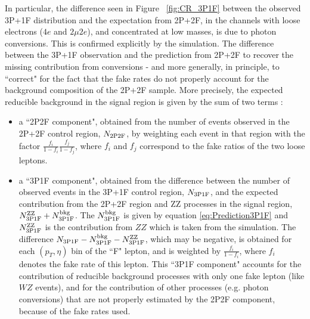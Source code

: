 In particular, the  difference seen in Figure ~\ref{fig:CR_3P1F} between the observed
3P+1F distribution and the expectation from 2P+2F, in the
channels with loose electrons ($4e$ and $2\mu 2e$), and concentrated at low
masses, is due to photon conversions. This is confirmed explicitly by the
simulation.
%
The difference between the 3P+1F observation and the prediction
from 2P+2F to recover the missing contribution from conversions - and more generally,
in principle, to ``correct" for the fact that the fake rates do not properly
account for the background composition of the 2P+2F sample.
More precisely, the expected reducible background in the signal region is given
by the sum of two terms :
%
\begin{itemize}
\item a ``2P2F component", obtained from the number of
  events observed in the 2P+2F control region, $N_{\rm 2P2F}$, by
  weighting each event in that region with the factor
  $\frac{f_{i}}{1-f_{i}} \frac{f_{j}}{1-f_{j}}$, where $f_{i}$ and
  $f_{j}$ correspond to the fake ratios of the two loose leptons.
\item a ``3P1F component", obtained from the
   difference between the number of observed events in the 3P+1F control
   region, $N_{\rm 3P1F}$, and the expected contribution from the 2P+2F
   region and ZZ processes in the signal region, $N^{\rm ZZ}_{\rm 3P1F} +
   N^{\rm bkg}_{\rm 3P1F}$. The $N^{\rm bkg}_{\rm 3P1F}$ is given by 
   equation \ref{eq:Prediction3P1F} and $N^{\rm ZZ}_{\rm 3P1F}$ is the
   contribution from $ZZ$ which is taken from the simulation. 
   The difference $N_{\rm 3P1F} -  N^{\rm bkg}_{\rm 3P1F} - N^{\rm ZZ}_{\rm 3P1F}$,
   which may be negative,
   is obtained for each $(p_T, \eta)$ bin of the ``F" lepton, and is weighted 
   by $\frac{f_i} {1 - f_i}$, where $f_i$ denotes the fake rate of
   this lepton.
   This ``3P1F component" accounts for the contribution of reducible background
   processes with only one fake lepton (like $WZ$ events), and for the contribution
   of other processes (e.g. photon conversions) that are not properly estimated
   by the 2P2F component, because of the fake rates used.
\end{itemize}

